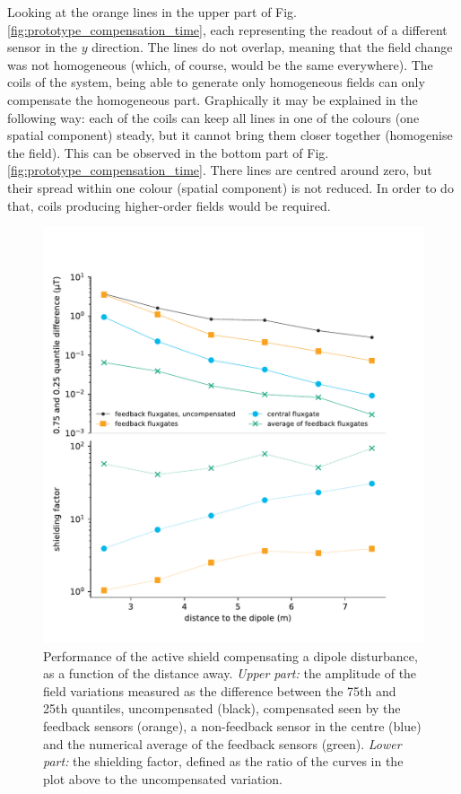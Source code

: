 Looking at the orange lines in the upper part of Fig.\,\ref{fig:prototype_compensation_time}, each representing the readout of a different sensor in the $y$ direction.
The lines do not overlap, meaning that the field change was not homogeneous (which, of course, would be the same everywhere).
The coils of the system, being able to generate only homogeneous fields can only compensate the homogeneous part.
Graphically it may be explained in the following way: each of the coils can keep all lines in one of the colours (one spatial component) steady, but it cannot bring them closer together (homogenise the field).
This can be observed in the bottom part of Fig.\,\ref{fig:prototype_compensation_time}.
There lines are centred around zero, but their spread within one colour (spatial component) is not reduced.
In order to do that, coils producing higher-order fields would be required.

\begin{figure}
  \centering
  \includegraphics[width=0.85\linewidth]{gfx/prototype/big_magnet_performance_shielding_factor.pdf}
  \caption{Performance of the active shield compensating a dipole disturbance, as a function of the distance away. \emph{Upper part:} the amplitude of the field variations measured as the difference between the 75th and 25th quantiles, uncompensated (black), compensated seen by the feedback sensors (orange), a non-feedback sensor in the centre (blue) and the numerical average of the feedback sensors (green). \emph{Lower part:} the shielding factor, defined as the ratio of the curves in the plot above to the uncompensated variation.}\label{fig:prototype_compensation}
\end{figure}


